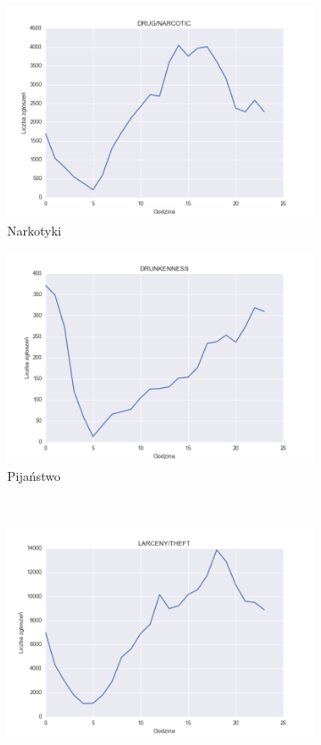 \documentclass[11pt]{article} %
\begin{document}
\begin{figure}[!h]
\begin{subfigure}{0.48\linewidth}
   \includegraphics[width=\linewidth]{images/crimes_per_hour/7}
   \caption{Narkotyki}
   \label{fig:crimes_per_hour_3}
\end{subfigure}
\hfill
\begin{subfigure}{0.48\linewidth}
   \centering
   \includegraphics[width=\linewidth]{images/crimes_per_hour/8}
   \caption{Pijaństwo}
   \label{fig:crimes_per_hour_4}
\end{subfigure}
\\[\baselineskip]
   \begin{subfigure}{0.48\linewidth}
   \centering
   \includegraphics[width=\linewidth]{images/crimes_per_hour/16}

\end{subfigure}
\end{figure}
\end{document}
